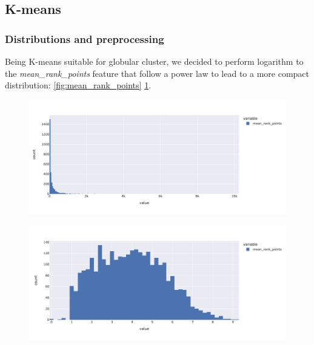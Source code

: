 \documentclass{article}
\begin{document}
\subsection{K-means}

\subsubsection{Distributions and preprocessing}
Being K-means suitable for globular cluster, we decided to perform logarithm to the \textit{mean\_rank\_points} feature that follow a power law to lead to a more compact distribution:
\ref{fig:mean_rank_points}  \ref{fig:log_mean_rank_points}.

\begin{figure}[h]
\centering
\begin{minipage}{.5\textwidth}
\centering
\includegraphics[width=\textwidth]{plots/kmeans/preprocessing/mean_rank_points}
\label{fig:mean_rank_points}
\end{minipage}%
\begin{minipage}{.5\textwidth}
\centering
\includegraphics[width=\textwidth]{plots/kmeans/preprocessing/log_mean_rank_points.png}
\label{fig:log_mean_rank_points}
\end{minipage}
\end{figure}
\end{document}
